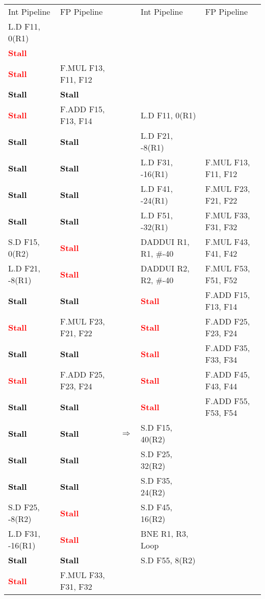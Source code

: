 \documentclass[11pt]{article}
\newcommand{\code}[1]{\textsf{#1}}
\newcommand{\stall}{\textcolor{red}{\textbf{Stall}}}
\newcommand{\cellstall}{\cellcolor{red!25}\textcolor{black}{\textbf{Stall}}}
\begin{document}
\begin{table}[h]
\begin{tabular}{llcll}
	 Int Pipeline & FP Pipeline & & Int Pipeline & FP Pipeline \\
	 \code{L.D F11, 0(R1)} &  & & & \\
	 \stall &  & & & \\
	 \stall & \code{F.MUL F13, F11, F12} & & & \\
	 \cellstall & \cellstall & & & \\
	 \stall & \code{F.ADD F15, F13, F14} & & \code{L.D F11, 0(R1)} &  \\
	 \cellstall & \cellstall & & \code{L.D F21, -8(R1)} &  \\
	 \cellstall & \cellstall &  & \code{L.D F31, -16(R1)} & \code{F.MUL F13, F11, F12} \\
	 \cellstall & \cellstall & & \code{L.D F41, -24(R1)} & \code{F.MUL F23, F21, F22} \\
	 \cellstall & \cellstall & & \code{L.D F51, -32(R1)} & \code{F.MUL F33, F31, F32} \\
	 \code{S.D F15, 0(R2)} & \stall & & \code{DADDUI R1, R1, \#-40} & \code{F.MUL F43, F41, F42} \\
	 \code{L.D F21, -8(R1)} & \stall & & \code{DADDUI R2, R2, \#-40} & \code{F.MUL F53, F51, F52} \\
	 \cellstall & \cellstall & & \stall & \code{F.ADD F15, F13, F14} \\ 
	 \stall & \code{F.MUL F23, F21, F22} & & \stall & \code{F.ADD F25, F23, F24} \\
	 \cellstall & \cellstall & & \stall & \code{F.ADD F35, F33, F34} \\
	 \stall & \code{F.ADD F25, F23, F24} & & \stall & \code{F.ADD F45, F43, F44} \\
	 \cellstall & \cellstall & & \stall & \code{F.ADD F55, F53, F54} \\
	 \cellstall & \cellstall & $\Rightarrow$ & \code{S.D F15, 40(R2)} &   \\
	 \cellstall & \cellstall & & \code{S.D F25, 32(R2)} &  \\ 
	 \cellstall & \cellstall & & \code{S.D F35, 24(R2)} &  \\
	 \code{S.D F25, -8(R2)} & \stall & & \code{S.D F45, 16(R2)} &  \\
	 \code{L.D F31, -16(R1)} & \stall & & \code{BNE R1, R3, Loop} &  \\ 
	 \cellstall & \cellstall & &  \code{S.D F55, 8(R2)} &  \\	
	 \stall & \code{F.MUL F33, F31, F32} & &  &  \\ 

\end{tabular}
\end{table}
\end{document}
